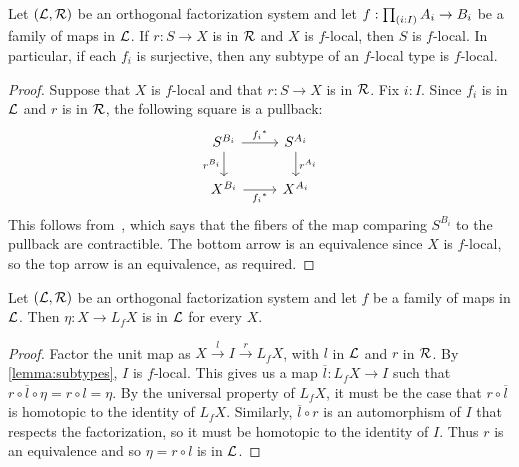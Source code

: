 \begin{lem}\label{lemma:subtypes}
    Let $(\mathcal{L}, \mathcal{R})$ be an orthogonal factorization system and
    let $f : \prd{i:I} A_i \to B_i$ be a family of maps in $\mathcal{L}$.
    If $r : S \to X$ is in $\mathcal{R}$ and $X$ is $f$-local, then $S$ is $f$-local.
    In particular, if each $f_i$ is surjective,
    then any subtype of an $f$-local type is $f$-local.
\end{lem}

\begin{proof}
    Suppose that $X$ is $f$-local
    and that $r : S \to X$ is in $\mathcal{R}$.
    Fix $i : I$.
    Since $f_i$ is in $\mathcal{L}$ and $r$ is in $\mathcal{R}$, the following square is a pullback:
\begin{equation*}
\begin{tikzcd}
S^{B_i} \arrow[r,"\precomp{f_i}"] \arrow[d,swap,"r^{B_i}"] & S^{A_i} \arrow[d,"r^{A_i}"] \\
X^{B_i} \arrow[r,swap,"\precomp{f_i}"] & X^{A_i}
\end{tikzcd}
\end{equation*}
    This follows from~\cite[Lemma~1.44]{RijkeShulmanSpitters}, which says that the fibers of
    the map comparing $S^{B_i}$ to the pullback are contractible.
    The bottom arrow is an equivalence since $X$ is $f$-local,
    so the top arrow is an equivalence, as required.
\end{proof}

\begin{thm}\label{theorem:localizationpreservesconnected}
    Let $(\mathcal{L}, \mathcal{R})$ be an orthogonal factorization system and
    let $f$ be a family of maps in $\mathcal{L}$.
    Then $\eta : X \to L_f X$ is in $\mathcal{L}$ for every $X$.
\end{thm}


\begin{proof}
    Factor the unit map as $X \xrightarrow{l} I \xrightarrow{r} L_f X$, with $l$ in $\mathcal{L}$
    and $r$ in $\mathcal{R}$.
    By \cref{lemma:subtypes},
    $I$ is $f$-local. This gives us a map $\overline{l} : L_f X \to I$
    such that $r \circ \overline{l} \circ \eta = r \circ l = \eta$.
    By the universal property of $L_f X$, it must be the case that $r \circ \overline{l}$
    is homotopic to the identity of $L_f X$.
    Similarly, $\overline{l} \circ r$ is an automorphism of $I$ that respects the
    factorization, so it must be homotopic to the identity of $I$.
    Thus $r$ is an equivalence and so $\eta = r \circ l$ is in $\mathcal{L}$.
\end{proof}

